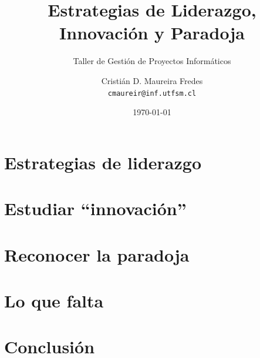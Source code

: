 \documentclass{beamer}
\title[Estrategias de liderazgo, ...]{Estrategias de Liderazgo, Innovación y Paradoja}
\subtitle{Taller de Gestión de Proyectos Informáticos}
\author[C. Maureira]{Cristián D. Maureira Fredes\\ \small{\texttt{cmaureir@inf.utfsm.cl}}}
\institute[UTFSM]{Universidad Técnica Federico Santa María}
\date{\today}
\begin{document}
	\frame{\titlepage}
	\frame{\tableofcontents}
	\section{Estrategias de liderazgo}
	
	\section{Estudiar ``innovación''}
	
	\section{Reconocer la paradoja}
	
	\section{Lo que falta}
	
	\section{Conclusión}
	
\end{document}
